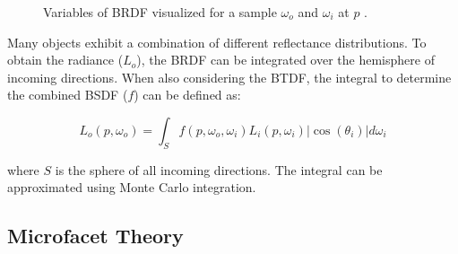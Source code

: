 \begin{figure}[H]
  \centering
  \caption{Variables of \gls{BRDF} visualized for a sample $\omega_o$ and $\omega_i$ at $p$ \cite{Pharr_Physically_Based_Rendering_2023}.}
  \label{fig:brdf-visualized}
\end{figure}

Many objects exhibit a combination of different reflectance distributions. To obtain the radiance ($L_o$), the \gls{BRDF} can be integrated over the hemisphere of incoming directions. When also considering the \gls{BTDF}, the integral to determine the combined \gls{BSDF} ($f$) can be defined as:

\begin{equation}
  L_o(p, \omega_o) = \int_{S} f(p, \omega_o, \omega_i) L_i(p, \omega_i) |\cos(\theta_i)| d\omega_i
\end{equation}

where $S$ is the sphere of all incoming directions. The integral can be approximated using Monte Carlo integration. \cite{Pharr_Physically_Based_Rendering_2023}

\subsection*{Microfacet Theory}

